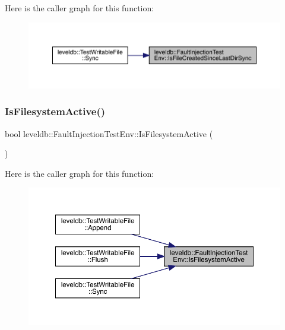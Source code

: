 Here is the caller graph for this function\+:
\nopagebreak
\begin{figure}[H]
\begin{center}
\leavevmode
\includegraphics[width=350pt]{classleveldb_1_1_fault_injection_test_env_ae9460fecd27d35869bfc4de6ff4538e3_icgraph}
\end{center}
\end{figure}
\mbox{\label{classleveldb_1_1_fault_injection_test_env_ac789749a61e5ac70906d23c0af2eb26e}} 
\subsubsection{\texorpdfstring{IsFilesystemActive()}{IsFilesystemActive()}}
{\footnotesize\ttfamily bool leveldb\+::\+Fault\+Injection\+Test\+Env\+::\+Is\+Filesystem\+Active (\begin{DoxyParamCaption}{ }\end{DoxyParamCaption})\hspace{0.3cm}{\ttfamily [inline]}}

Here is the caller graph for this function\+:
\nopagebreak
\begin{figure}[H]
\begin{center}
\leavevmode
\includegraphics[width=350pt]{classleveldb_1_1_fault_injection_test_env_ac789749a61e5ac70906d23c0af2eb26e_icgraph}
\end{center}
\end{figure}
\mbox{\label{classleveldb_1_1_fault_injection_test_env_ab3147789bfa49d4a50a06e7c2a1628ef}} 
